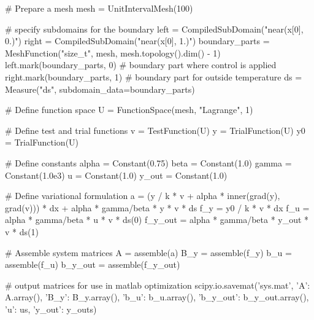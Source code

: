 \documentclass[
12pt, %
a4paper, %
onecolumn, %
portrait %
]{article}
\begin{document}
\begin{python}
# Prepare a mesh
mesh = UnitIntervalMesh(100)

# specify subdomains for the boundary
left = CompiledSubDomain("near(x[0], 0.)")
right = CompiledSubDomain("near(x[0], 1.)")
boundary_parts = MeshFunction("size_t", mesh, mesh.topology().dim() - 1)
left.mark(boundary_parts, 0)    # boundary part where control is applied
right.mark(boundary_parts, 1)   # boundary part for outside temperature
ds = Measure("ds", subdomain_data=boundary_parts)

# Define function space
U = FunctionSpace(mesh, "Lagrange", 1)

# Define test and trial functions
v = TestFunction(U)
y = TrialFunction(U)
y0 = TrialFunction(U)

# Define constants
alpha = Constant(0.75)
beta = Constant(1.0)
gamma = Constant(1.0e3)
u = Constant(1.0)
y_out = Constant(1.0)

# Define variational formulation
a = (y / k * v + alpha * inner(grad(y), grad(v))) * dx + alpha * gamma/beta * y * v * ds
f_y = y0 / k * v * dx
f_u = alpha * gamma/beta * u * v * ds(0)
f_y_out = alpha * gamma/beta * y_out * v * ds(1)

# Assemble system matrices
A = assemble(a)
B_y = assemble(f_y)
b_u = assemble(f_u)
b_y_out = assemble(f_y_out)

# output matrices for use in matlab optimization
scipy.io.savemat('sys.mat', {'A': A.array(), 'B_y': B_y.array(), 'b_u': b_u.array(), 'b_y_out': b_y_out.array(), 'u': us, 'y_out': y_outs})
\end{python}
\end{document}
